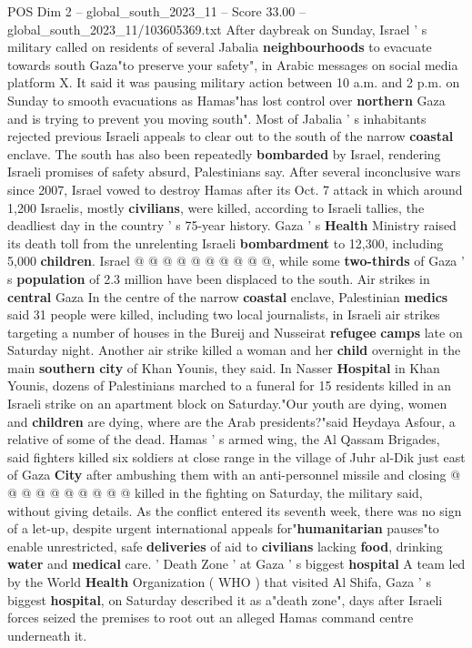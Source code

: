 \begin{textsample}{POS Dim 2 – global\_south\_2023\_11 – Score 33.00 – global\_south\_2023\_11/103605369.txt}
After daybreak on Sunday, Israel ' s military called on residents of several Jabalia \textbf{neighbourhoods} to evacuate towards south Gaza"to preserve your safety", in Arabic messages on social media platform X.
It said it was pausing military action between 10 a.m. and 2 p.m. on Sunday to smooth evacuations as Hamas"has lost control over \textbf{northern} Gaza and is trying to prevent you moving south".
Most of Jabalia ' s inhabitants rejected previous Israeli appeals to clear out to the south of the narrow \textbf{coastal} enclave.
The south has also been repeatedly \textbf{bombarded} by Israel, rendering Israeli promises of safety absurd, Palestinians say.
After several inconclusive wars since 2007, Israel vowed to destroy Hamas after its Oct. 7 attack in which around 1,200 Israelis, mostly \textbf{civilians}, were killed, according to Israeli tallies, the deadliest day in the country ' s 75-year history.
Gaza ' s \textbf{Health} Ministry raised its death toll from the unrelenting Israeli \textbf{bombardment} to 12,300, including 5,000 \textbf{children}.
Israel @ @ @ @ @ @ @ @ @ @, while some \textbf{two-thirds} of Gaza ' s \textbf{population} of 2.3 million have been displaced to the south.
Air strikes in \textbf{central} Gaza In the centre of the narrow \textbf{coastal} enclave, Palestinian \textbf{medics} said 31 people were killed, including two local journalists, in Israeli air strikes targeting a number of houses in the Bureij and Nusseirat \textbf{refugee} \textbf{camps} late on Saturday night.
Another air strike killed a woman and her \textbf{child} overnight in the main \textbf{southern} \textbf{city} of Khan Younis, they said.
In Nasser \textbf{Hospital} in Khan Younis, dozens of Palestinians marched to a funeral for 15 residents killed in an Israeli strike on an apartment block on Saturday."Our youth are dying, women and \textbf{children} are dying, where are the Arab presidents?"said Heydaya Asfour, a relative of some of the dead.
Hamas ' s armed wing, the Al Qassam Brigades, said fighters killed six soldiers at close range in the village of Juhr al-Dik just east of Gaza \textbf{City} after ambushing them with an anti-personnel missile and closing @ @ @ @ @ @ @ @ @ @ killed in the fighting on Saturday, the military said, without giving details.
As the conflict entered its seventh week, there was no sign of a let-up, despite urgent international appeals for"\textbf{humanitarian} pauses"to enable unrestricted, safe \textbf{deliveries} of aid to \textbf{civilians} lacking \textbf{food}, drinking \textbf{water} and \textbf{medical} care. ' Death Zone ' at Gaza ' s biggest \textbf{hospital} A team led by the World \textbf{Health} Organization ( WHO ) that visited Al Shifa, Gaza ' s biggest \textbf{hospital}, on Saturday described it as a"death zone", days after Israeli forces seized the premises to root out an alleged Hamas command centre underneath it.

\end{textsample}
